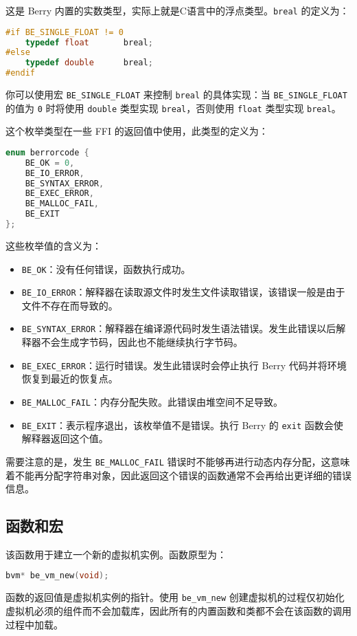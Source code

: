 
这是 Berry 内置的实数类型，实际上就是C语言中的浮点类型。\texttt{breal} 的定义为：
\begin{lstlisting}[language=c, style=berry, numbers=none]
#if BE_SINGLE_FLOAT != 0
    typedef float       breal;
#else
    typedef double      breal;
#endif
\end{lstlisting}
你可以使用宏 \texttt{BE\_SINGLE\_FLOAT} 来控制 \texttt{breal} 的具体实现：当 \texttt{BE\_SINGLE\_FLOAT} 的值为 \texttt{0} 时将使用 \texttt{double} 类型实现 \texttt{breal}，否则使用 \texttt{float} 类型实现 \texttt{breal}。

 \label{section::errorcode}

这个枚举类型在一些 FFI 的返回值中使用，此类型的定义为：
\begin{lstlisting}[language=c, style=berry, numbers=none]
enum berrorcode {
    BE_OK = 0,
    BE_IO_ERROR,
    BE_SYNTAX_ERROR,
    BE_EXEC_ERROR,
    BE_MALLOC_FAIL,
    BE_EXIT
};
\end{lstlisting}
这些枚举值的含义为：
\begin{itemize}
    \item \texttt{BE\_OK}：没有任何错误，函数执行成功。
    \item \texttt{BE\_IO\_ERROR}：解释器在读取源文件时发生文件读取错误，该错误一般是由于文件不存在而导致的。
    \item \texttt{BE\_SYNTAX\_ERROR}：解释器在编译源代码时发生语法错误。发生此错误以后解释器不会生成字节码，因此也不能继续执行字节码。
    \item \texttt{BE\_EXEC\_ERROR}：运行时错误。发生此错误时会停止执行 Berry 代码并将环境恢复到最近的恢复点。
    \item \texttt{BE\_MALLOC\_FAIL}：内存分配失败。此错误由堆空间不足导致。
    \item \texttt{BE\_EXIT}：表示程序退出，该枚举值不是错误。执行 Berry 的 \texttt{exit} 函数会使解释器返回这个值。
\end{itemize}

需要注意的是，发生 \texttt{BE\_MALLOC\_FAIL} 错误时不能够再进行动态内存分配，这意味着不能再分配字符串对象，因此返回这个错误的函数通常不会再给出更详细的错误信息。

\subsection{函数和宏}


该函数用于建立一个新的虚拟机实例。函数原型为：
\begin{lstlisting}[language=c, style=berry, numbers=none]
bvm* be_vm_new(void);
\end{lstlisting}
函数的返回值是虚拟机实例的指针。使用 \texttt{be\_vm\_new} 创建虚拟机的过程仅初始化虚拟机必须的组件而不会加载库，因此所有的内置函数和类都不会在该函数的调用过程中加载。

